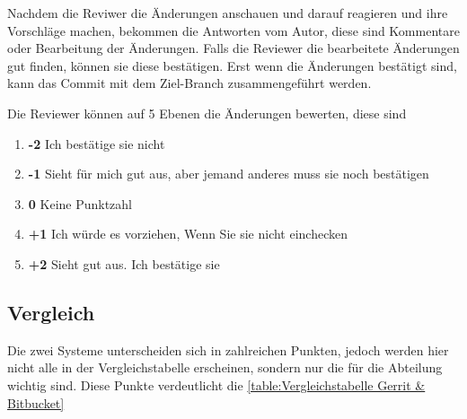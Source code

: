 Nachdem die Reviwer die Änderungen anschauen und darauf reagieren und ihre Vorschläge machen, bekommen die Antworten vom Autor, diese sind Kommentare oder Bearbeitung der Änderungen. Falls die Reviewer die bearbeitete Änderungen gut finden, können sie diese bestätigen. Erst wenn die Änderungen bestätigt sind, kann das Commit mit dem Ziel-Branch zusammengeführt werden.

Die Reviewer können auf 5 Ebenen die Änderungen bewerten, diese sind
\begin{enumerate}
	\item \textbf{-2} Ich bestätige sie nicht
	\item \textbf{-1} Sieht für mich gut aus, aber jemand anderes muss sie noch bestätigen
	\item \textbf{0}  Keine Punktzahl
	\item \textbf{+1} Ich würde es vorziehen, Wenn Sie sie nicht einchecken
	\item \textbf{+2} Sieht gut aus. Ich bestätige sie
\end{enumerate}

\subsection{Vergleich}
\label{subsec:Vergleich_Bitbucket_Gerrit}

Die zwei Systeme unterscheiden sich in zahlreichen Punkten, jedoch werden hier nicht alle in der Vergleichstabelle erscheinen, sondern nur die für die Abteilung wichtig sind. Diese Punkte verdeutlicht die \cref{table:Vergleichstabelle Gerrit & Bitbucket}

